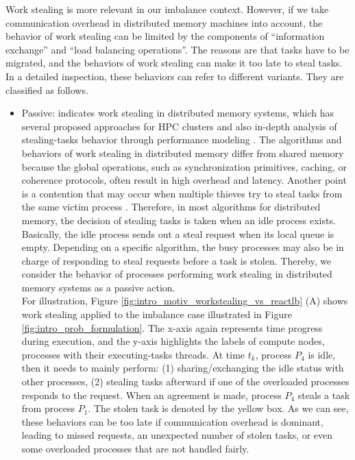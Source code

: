 Work stealing is more relevant in our imbalance context. However, if we take communication overhead in distributed memory machines into account, the behavior of work stealing can be limited by the components of ``information exchange'' and ``load balancing operations''. The reasons are that tasks have to be migrated, and the behaviors of work stealing can make it too late to steal tasks. In a detailed inspection, these behaviors can refer to different variants. They are classified as follows.
\begin{itemize}
	\item Passive: indicates work stealing in distributed memory systems, which has several proposed approaches for HPC clusters \cite{ravichandran2011wsmulticorhpc} and also in-depth analysis of stealing-tasks behavior through performance modeling \cite{gast2021analysis}. The algorithms and behaviors of work stealing in distributed memory differ from shared memory because the global operations, such as synchronization primitives, caching, or coherence protocols, often result in high overhead and latency. Another point is a contention that may occur when multiple thieves try to steal tasks from the same victim process \cite{paudel2013meritdistws}. Therefore, in most algorithms for distributed memory, the decision of stealing tasks is taken when an idle process exists. Basically, the idle process sends out a steal request when its local queue is empty. Depending on a specific algorithm, the busy processes may also be in charge of responding to steal requests before a task is stolen. Thereby, we consider the behavior of processes performing work stealing in distributed memory systems as a passive action.\\
	
	 For illustration, Figure \ref{fig:intro_motiv_workstealing_vs_reactlb} (A) shows work stealing applied to the imbalance case illustrated in Figure \ref{fig:intro_prob_formulation}. The x-axis again represents time progress during execution, and the y-axis highlights the labels of compute nodes, processes with their executing-tasks threads. At time $t_{k}$, process $P_{4}$ is idle, then it needs to mainly perform: (1) sharing/exchanging the idle status with other processes, (2) stealing tasks afterward if one of the overloaded processes responds to the request. When an agreement is made, process $P_{4}$ steals a task from process $P_{1}$. The stolen task is denoted by the yellow box. As we can see, these behaviors can be too late if communication overhead is dominant, leading to missed requests, an unexpected number of stolen tasks, or even some overloaded processes that are not handled fairly.
	

\end{itemize}
